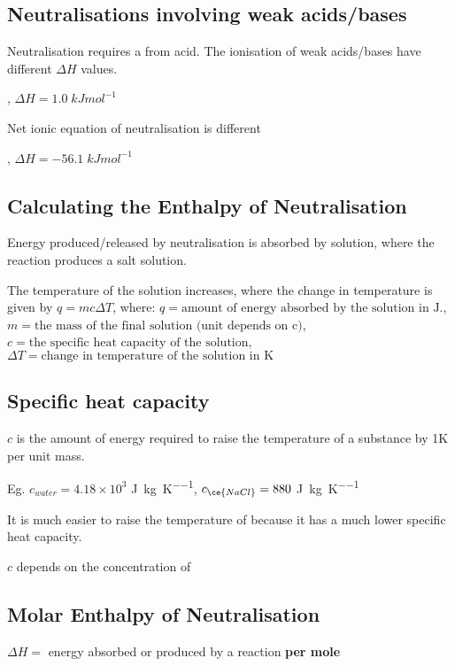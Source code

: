 	\subsection{Neutralisations involving weak acids/bases}
		Neutralisation requires a  from acid. The ionisation of weak acids/bases have different $\Delta H$ values.

		\begin{center}
			, $\Delta H = 1.0 \; kJmol^{-1}$
		\end{center}

		Net ionic equation of neutralisation is different

		\begin{center}
			, $\Delta H = -56.1 \; kJmol^{-1}$
		\end{center}

	\subsection{Calculating the Enthalpy of Neutralisation}
		Energy produced/released by neutralisation is absorbed by solution, where the reaction produces a salt solution.

		The temperature of the solution increases, where the change in temperature is given by $q = mc \Delta T$, where: $q = \text{amount of energy absorbed by the solution in J}$., $m = \text{the mass of the final solution (unit depends on c)}$, $c = \text{the specific heat capacity of the solution}$, $\Delta T = \text{change in temperature of the solution in K}$

	\subsection{Specific heat capacity}
		$c$ is the amount of energy required to raise the temperature of a substance by 1K per unit mass.

		Eg. $c_{water} = 4.18 \times 10^3$ \si{\joule\per\kilogram\per\kelvin}, $c_{\ce{NaCl}} = 880$ \si{\joule\per\kilogram\per\kelvin}

		It is much easier to raise the temperature of  because it has a much lower specific heat capacity.

		$c$ depends on the concentration of 

	\subsection{Molar Enthalpy of Neutralisation}
		$\Delta H =$ energy absorbed or produced by a reaction \textbf{per mole}

